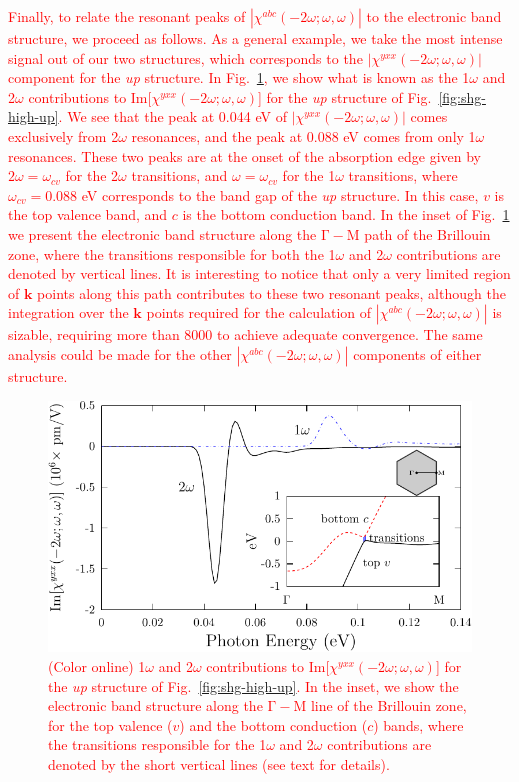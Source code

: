\documentclass[pss]{wiley2sp} %
\begin{document}
\textcolor{red}{Finally, 
to relate the resonant peaks of 
$|\chi^{abc}(-2\omega;\omega,\omega)|$ 
to the electronic band structure, we proceed as follows.
As a general example,
we take the most intense signal out of our two structures, which
corresponds to the
$|\chi^{yxx}(-2\omega;\omega,\omega)|$ component
for the {\it up} 
 structure.
In Fig.~\ref{fig:bands}, we show
what is known as the 1$\omega$ and 2$\omega$
contributions \cite{andersonPRB15}  to 
Im[$\chi^{yxx}(-2\omega;\omega,\omega)$]   
for the {\it up} structure of Fig.~\ref{fig:shg-high-up}.
We see that the peak at 0.044 eV of
$|\chi^{yxx}(-2\omega;\omega,\omega)|$
comes exclusively from 2$\omega$ resonances,
and the peak at 0.088 eV comes from only 1$\omega$ resonances. 
These two peaks are at the onset of the absorption edge given by 
$2\omega=\omega_{cv}$ for the 2$\omega$ transitions, and 
$\omega=\omega_{cv}$ for the 1$\omega$ transitions, where
$\omega_{cv}=0.088$ eV corresponds to the band gap of the {\it up}
structure.
In this case,
$v$ is  the top valence band, and $c$ is the bottom conduction
band.
In the inset 
of Fig.~\ref{fig:bands}
we present the electronic band structure along the $\mathrm{\Gamma-M}$
path of 
the Brillouin zone, 
where the transitions responsible 
for both the 1$\omega$ and 2$\omega$ contributions are denoted by vertical 
lines. It is interesting to notice that only a very limited region of
$\mathbf{k}$ points  
along this path contributes to these two resonant peaks, although
the integration over   
the $\mathbf{k}$ points required for the calculation of
$|\chi^{abc}(-2\omega;\omega,\omega)|$ \cite{andersonPRB15}
 is sizable,  requiring more
than 8000 to
achieve adequate convergence. 
The same analysis could be made for the other 
$|\chi^{abc}(-2\omega;\omega,\omega)|$ components of either structure.}

\begin{figure}[t]
\includegraphics[width=\linewidth]{figures/band-structure-up}
\caption{\textcolor{red}{(Color online) 
1$\omega$ and 2$\omega$ contributions to 
Im[$\chi^{yxx}(-2\omega;\omega,\omega)$] 
for the {\it up} structure of Fig.~\ref{fig:shg-high-up}. In the inset, 
we show the electronic band structure along the $\mathrm{\Gamma-M}$ line of 
the Brillouin zone, for the top valence ($v$) and the bottom
conduction ($c$) bands,
where the transitions responsible 
for the 1$\omega$ and 2$\omega$ contributions are denoted by the short
vertical lines (see text for details).}} 
\label{fig:bands}
\end{figure}
\end{document}
